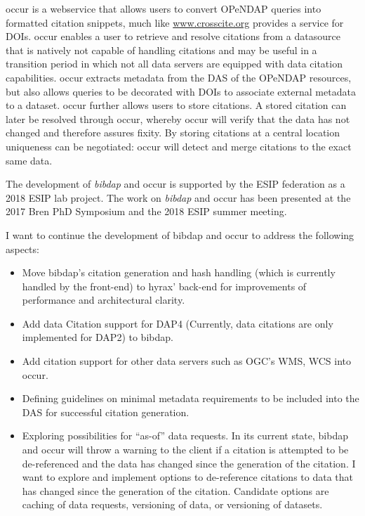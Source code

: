 \documentclass[a4paper,10pt]{article}
\begin{document}
\Gls{occur} is a webservice that allows users to convert \gls{OPeNDAP} queries into formatted citation snippets, much like \url{www.crosscite.org} provides a service for \glspl{DOI}.
\gls{occur} enables a user to retrieve and resolve citations from a datasource that is natively not capable of handling citations and may be useful in a transition period in which not all data servers are equipped with data citation capabilities. \gls{occur} extracts metadata from the \gls{DAS} of the \gls{OPeNDAP} resources, but also allows queries to be decorated with \glspl{DOI} to associate external metadata to a dataset. \gls{occur} further allows users to store citations. A stored citation can later be resolved through \gls{occur}, whereby \gls{occur} will verify that the data has not changed and therefore assures fixity. By storing citations at a central location uniqueness can be negotiated: \gls{occur} will detect and merge citations to the exact same data.

The development of \textit{bibdap} and \gls{occur} is supported by the \gls{ESIP} federation as a 2018 \gls{ESIP} lab project. The work on \textit{bibdap} and \gls{occur} has been presented at the 2017 Bren PhD Symposium and the 2018 \gls{ESIP} summer meeting.


I want to continue the development of bibdap and occur to address the following aspects:

\begin{itemize} 
 \item Move bibdap's citation generation and hash handling (which is currently handled by the front-end) to hyrax' back-end for improvements of performance and architectural clarity.
 \item Add data Citation support for DAP4 (Currently, data citations are only implemented for DAP2) to bibdap.
 \item Add citation support for other data servers such as \gls{OGC}'s \gls{WMS}, \gls{WCS} into \gls{occur}.  
 \item Defining guidelines on minimal metadata requirements to be included into the \gls{DAS} for successful citation generation.
 \item Exploring possibilities for ``as-of'' data requests. In its current state, bibdap and occur will throw a warning to the client if a citation is attempted to be de-referenced and the data has changed since the generation of the citation. I want to explore and implement options to de-reference citations to data that has changed since the generation of the citation. Candidate options are caching of data requests, versioning of data, or versioning of datasets.
\end{itemize}
\end{document}
